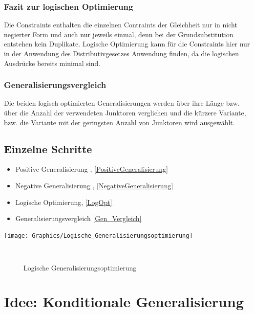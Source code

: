 \documentclass[a4paper, 11pt]{book}
\begin{document}
{		\subsubsection{\large{ Fazit zur logischen Optimierung}}
		 Die Constraints enthalten die einzelnen Contraints der Gleichheit nur in nicht negierter Form und auch nur jeweils einmal, denn bei der Grundsubstitution entstehen kein Duplikate. 
		 Logische Optimierung kann für die Constraints hier nur in der Anwendung des Distributivgesetzes Anwendung finden, da die logischen Ausdrücke bereits minimal sind.	
		 \subsubsection{Generalisierungsvergleich}  \label{Gen_Vergleich}
		 Die beiden logisch optimierten Generalisierungen werden über ihre Länge bzw. über die Anzahl der verwendeten Junktoren verglichen und die kürzere Variante, bzw. die Variante mit der geringsten Anzahl von Junktoren wird ausgewählt.
}
\subsection{Einzelne Schritte}
\begin{itemize}
	\item Positive Generalisierung , \ref{PositiveGeneralisierung}
	\item Negative Generalisierung , \ref{NegativeGeneralisierung}
	\item Logische Optimierung, \ref{LogOpt}
	\item Generalisierungsvergleich \ref{Gen_Vergleich}
\end{itemize}
\texttt{[image: Graphics/Logische\_Generalisierungsoptimierung]}\label{Abb_Log_Gen}
\begin{figure}[h]
	\caption{Logische Generalisierungsoptimierung }\
\end{figure}
\section{Idee: Konditionale Generalisierung}
\end{document}
